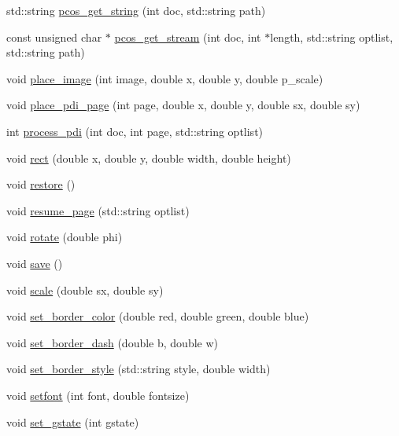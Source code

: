 \begin{DoxyCompactItemize}
\item 
std\+::string \hyperlink{classPDFlib_a3646a04ca4ada3420add8ee98a39dade}{pcos\+\_\+get\+\_\+string} (int doc, std\+::string path)
\item 
const unsigned char $\ast$ \hyperlink{classPDFlib_ab6dfb9502a37bf9312cf0431ca297819}{pcos\+\_\+get\+\_\+stream} (int doc, int $\ast$length, std\+::string optlist, std\+::string path)
\item 
void \hyperlink{classPDFlib_a17390ec77d9d1b476870cf72fce905aa}{place\+\_\+image} (int image, double x, double y, double p\+\_\+scale)
\item 
void \hyperlink{classPDFlib_ad56800ffc54122dfde959dbd4b922331}{place\+\_\+pdi\+\_\+page} (int page, double x, double y, double sx, double sy)
\item 
int \hyperlink{classPDFlib_a674e04d73bfe7ae771a60114445720a0}{process\+\_\+pdi} (int doc, int page, std\+::string optlist)
\item 
void \hyperlink{classPDFlib_a3c9ab4d05bd6b8716d311c05c91af04a}{rect} (double x, double y, double width, double height)
\item 
void \hyperlink{classPDFlib_a0e73e06c50b4adfe9bdf3d206b210442}{restore} ()
\item 
void \hyperlink{classPDFlib_ae9ae4ec9f2162c582fbd35ff9092c497}{resume\+\_\+page} (std\+::string optlist)
\item 
void \hyperlink{classPDFlib_a083f84661e2c6ae1af089ac7f48b3897}{rotate} (double phi)
\item 
void \hyperlink{classPDFlib_a15c53a7de05f502273b2a9e977f0b91d}{save} ()
\item 
void \hyperlink{classPDFlib_a34c2b8df5a25b153402144788f5108cf}{scale} (double sx, double sy)
\item 
void \hyperlink{classPDFlib_ae32d8f048a4bcc36c4440e844685d83e}{set\+\_\+border\+\_\+color} (double red, double green, double blue)
\item 
void \hyperlink{classPDFlib_aaf02e71f9941ea7f615579cbd70b1d75}{set\+\_\+border\+\_\+dash} (double b, double w)
\item 
void \hyperlink{classPDFlib_a0353836b9d1e47007aea5eb9573e4abf}{set\+\_\+border\+\_\+style} (std\+::string style, double width)
\item 
void \hyperlink{classPDFlib_a3454c94557adb7486abbad059bbe98f2}{setfont} (int font, double fontsize)
\item 
void \hyperlink{classPDFlib_ac40b1d868fb9430800c46667f49e16ff}{set\+\_\+gstate} (int gstate)
\item 

\end{DoxyCompactItemize}
